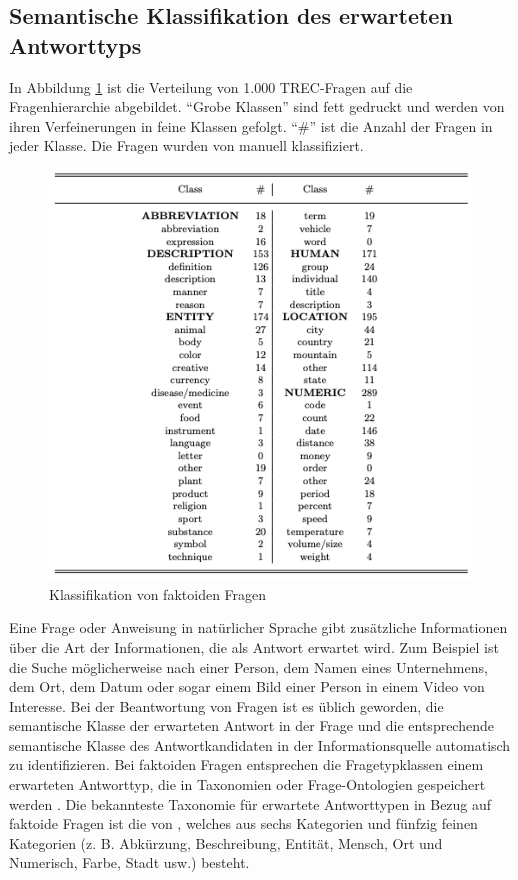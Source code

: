 \documentclass[
        ngerman,
        paper=a4,
        numbers=noendperiod,
]{scrreprt}
\begin{document}
\subsection{Semantische Klassifikation des erwarteten Antworttyps}
In Abbildung \ref{fig:lir} ist die Verteilung von 1.000 TREC-Fragen auf die Fragenhierarchie abgebildet. \enquote{Grobe Klassen} sind fett gedruckt und werden von ihren Verfeinerungen in feine Klassen gefolgt. \enquote{\#} ist die Anzahl der Fragen in jeder Klasse. Die Fragen wurden von \citep{li2006learning} manuell klassifiziert.
\begin{figure}[H]
\centering\includegraphics[width=0.7\linewidth]{images/lir.png}
\caption[Klassifikation von faktoiden Fragen]{Klassifikation von faktoiden Fragen \citep{li2006learning}}
\label{fig:lir}
\end{figure}



Eine Frage oder Anweisung in natürlicher Sprache gibt zusätzliche Informationen über die Art der Informationen, die als Antwort erwartet wird. Zum Beispiel ist die Suche möglicherweise nach einer Person, dem Namen eines Unternehmens, dem Ort, dem Datum oder sogar einem Bild einer Person in einem Video von Interesse. Bei der Beantwortung von Fragen ist es üblich geworden, die semantische Klasse der erwarteten Antwort in der Frage und die entsprechende semantische Klasse des Antwortkandidaten in der Informationsquelle automatisch zu identifizieren. Bei faktoiden Fragen entsprechen die Fragetypklassen einem erwarteten Antworttyp, die in Taxonomien oder Frage-Ontologien gespeichert werden \citep[S. 5420]{Kolomiyets2011APerspective}. 
Die bekannteste Taxonomie für erwartete Antworttypen in Bezug auf faktoide Fragen ist die von \citep{li2006learning}, welches aus sechs Kategorien und fünfzig feinen Kategorien (z. B. Abkürzung, Beschreibung, Entität, Mensch, Ort und Numerisch, Farbe, Stadt usw.) besteht.
\end{document}

